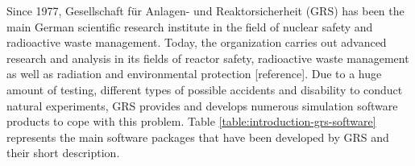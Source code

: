 Since 1977, Gesellschaft für Anlagen- und Reaktorsicherheit (GRS) has been the main German scientific research institute in the field of nuclear safety and radioactive waste management. Today, the organization carries out advanced research and analysis in its fields of reactor safety, radioactive waste management as well as radiation and environmental protection [reference]. Due to a huge amount of testing, different types of possible accidents and disability to conduct natural experiments, GRS provides and develops numerous simulation software products to cope with this problem. Table \ref{table:introduction-grs-software} represents the main software packages that have been developed by GRS and their short description.\\

